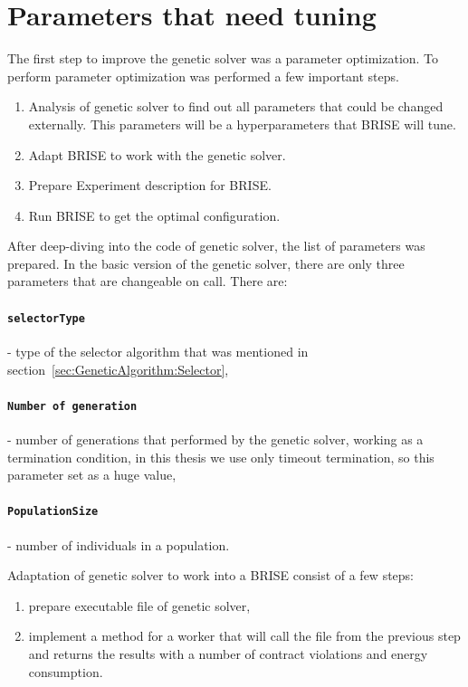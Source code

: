 \section{Parameters that need tuning}

The first step to improve the genetic solver was a parameter optimization. To perform parameter optimization was performed a few important steps.

\begin{enumerate}
	\item Analysis of genetic solver to find out all parameters that could be changed externally. This parameters will be a hyperparameters that BRISE will tune.
	\item Adapt BRISE to work with the genetic solver.
	\item Prepare Experiment description for BRISE.
	\item Run BRISE to get the optimal configuration.
\end{enumerate}

After deep-diving into the code of genetic solver, the list of parameters was prepared.
In the basic version of the genetic solver, there are only three parameters that are changeable on call. There are:
	\paragraph{\texttt{selectorType}} - type of the selector algorithm that was mentioned in section~\ref{sec:GeneticAlgorithm:Selector},
	\paragraph{\texttt{Number of generation}} - number of generations that performed by the genetic solver, working as a termination condition, in this thesis we use only timeout termination, so this parameter set as a huge value,
	\paragraph{\texttt{PopulationSize}} - number of individuals in a population.

Adaptation of genetic solver to work into a BRISE consist of a few steps:

\begin{enumerate}
	\item prepare executable file of genetic solver,
	\item implement a method for a worker that will call the file from the previous step and returns the results with a number of contract violations and energy consumption.
\end{enumerate}


